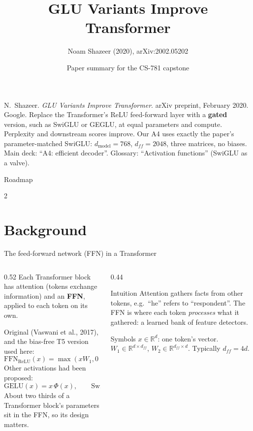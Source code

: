 \documentclass[aspectratio=169,11pt]{beamer}
\title[GLU Variants]{GLU Variants Improve Transformer}
\subtitle{Noam Shazeer (2020), arXiv:2002.05202}
\author[Paper summary]{Paper summary for the CS-781 capstone}
\date{}
\begin{document}
\begin{frame}\titlepage\end{frame}

\paperglance
{N.\ Shazeer. \emph{GLU Variants Improve Transformer}. arXiv preprint, February 2020. Google.}
{Replace the Transformer's ReLU feed-forward layer with a \textbf{gated} version, such as SwiGLU or GEGLU, at equal parameters and compute. Perplexity and downstream scores improve.}
{Our A4 uses exactly the paper's parameter-matched SwiGLU: $d_{\text{model}}=768$, $d_{ff}=2048$, three matrices, no biases.}
{Main deck: ``A4: efficient decoder''. Glossary: ``Activation functions'' (SwiGLU as a valve).}

\begin{frame}{Roadmap}
  \begin{multicols}{2}\small\tableofcontents\end{multicols}
\end{frame}

\section{Background}

\begin{frame}{The feed-forward network (FFN) in a Transformer}
  \begin{columns}[T]
    \begin{column}{0.52\textwidth}
      \small
      Each Transformer block has attention (tokens exchange information) and an \textbf{FFN}, applied to each token on its own.
      \vspace{1mm}

      Original (Vaswani et al., 2017), and the bias-free T5 version used here:
      \[
        \text{FFN}_{\text{ReLU}}(x)=\max(xW_1,0)\,W_2
      \]
      Other activations had been proposed:
      \[
        \text{GELU}(x)=x\,\Phi(x),\qquad \text{Swish}_\beta(x)=x\,\sigma(\beta x)
      \]
      About two thirds of a Transformer block's parameters sit in the FFN, so its design matters.
    \end{column}
    \begin{column}{0.44\textwidth}
      \begin{exampleblock}{Intuition}
        \small
        Attention gathers facts from other tokens, e.g.\ ``he'' refers to ``respondent''.
        The FFN is where each token \emph{processes} what it gathered: a learned bank of feature detectors.
      \end{exampleblock}
      \begin{block}{Symbols}
        \small
        $x\in\mathbb{R}^{d}$: one token's vector. $W_1\in\mathbb{R}^{d\times d_{ff}}$, $W_2\in\mathbb{R}^{d_{ff}\times d}$. Typically $d_{ff}=4d$.
      \end{block}
    \end{column}
  \end{columns}
\end{frame}
\end{document}
